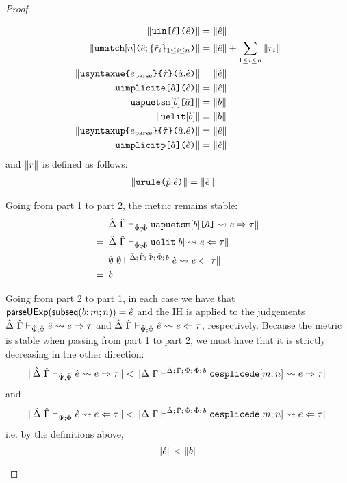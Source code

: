 \begin{proof}
\begin{itemize}
\begin{align*}
\Vert \texttt{uin}\texttt{[}\ell\texttt{](}{\hat e}\texttt{)} \Vert & = \Vert {\hat e} \Vert\\
\Vert \texttt{umatch}[n]\texttt{(}{\hat e}; \{\hat{r}_{i}\}_{1 \leq i \leq n}\texttt{)} \Vert & = \Vert {\hat e} \Vert + \sum_{1 \leq i \leq n} \Vert r_i \Vert\\
\Vert \texttt{usyntaxue}\texttt{\{}e_\text{parse}\texttt{\}\{}{\hat\tau}\texttt{\}(}\hat{a}.{\hat e}\texttt{)} \Vert & = \Vert {\hat e} \Vert\\
\Vert \texttt{uimplicite}\texttt{[}\hat{a}\texttt{](}{\hat e}\texttt{)} \Vert & = \Vert {\hat e} \Vert\\
\Vert \texttt{uapuetsm}[b]\texttt{[}\hat{a}\texttt{]} \Vert & = \Vert b \Vert\\
\Vert \texttt{uelit}[b] \Vert & = \Vert b \Vert\\
\Vert \texttt{usyntaxup}\texttt{\{}e_\text{parse}\texttt{\}\{}{\hat\tau}\texttt{\}(}\hat{a}.{\hat e}\texttt{)} \Vert & = \Vert {\hat e} \Vert\\
\Vert \texttt{uimplicitp}\texttt{[}\hat{a}\texttt{](}{\hat e}\texttt{)} \Vert & = \Vert {\hat e} \Vert
\end{align*}
and $\Vert r \Vert$ is defined as follows:
\begin{align*}
\Vert \texttt{urule}\texttt{(}\hat{p}.{\hat e}\texttt{)} \Vert & = \Vert {\hat e} \Vert
\end{align*}

Going from part 1 to part 2, the metric remains stable:
\begin{align*}
 & \Vert \hat{\Delta}~\hat{\Gamma} \vdash_{\hat{\Psi}; \hat\Phi} \texttt{uapuetsm}[b]\texttt{[}\hat{a}\texttt{]} \leadsto e \Rightarrow \tau \Vert\\
=& \Vert \hat{\Delta}~\hat{\Gamma} \vdash_{\hat{\Psi}; \hat\Phi} \texttt{uelit}[b] \leadsto e \Leftarrow \tau \Vert\\
=& \Vert \emptyset~\emptyset \vdash^{\hat{\Delta};\,\hat{\Gamma};\,\hat{\Psi};\,\hat\Phi;\,b} \grave{e} \leadsto e \Leftarrow \tau \Vert\\
=&\Vert b \Vert\end{align*}

Going from part 2 to part 1, in each case we have that $\mathsf{parseUExp}(\mathsf{subseq}(b; m; n))={\hat e}$ and the IH is applied to the judgements $\hat{\Delta}~\hat{\Gamma} \vdash_{\hat{\Psi}; \hat\Phi} {\hat e} \leadsto e \Rightarrow \tau$ and $\hat{\Delta}~\hat{\Gamma} \vdash_{\hat{\Psi}; \hat\Phi} {\hat e} \leadsto e \Leftarrow \tau$, respectively. Because the metric is stable when passing from part 1 to part 2, we must have that it is strictly decreasing in the other direction:
\[\Vert \hat{\Delta}~\hat{\Gamma} \vdash_{\hat{\Psi}; \hat\Phi} {\hat e} \leadsto e \Rightarrow \tau \Vert < \Vert \Delta~\Gamma \vdash^{\hat{\Delta};\,\hat{\Gamma};\,\hat{\Psi};\,\hat\Phi;\,b} \texttt{cesplicede}[m; n] \leadsto e \Rightarrow \tau \Vert\]
and
\[\Vert \hat{\Delta}~\hat{\Gamma} \vdash_{\hat{\Psi}; \hat\Phi} {\hat e} \leadsto e \Leftarrow \tau \Vert < \Vert \Delta~\Gamma \vdash^{\hat{\Delta};\,\hat{\Gamma};\,\hat{\Psi};\,\hat\Phi;\,b} \texttt{cesplicede}[m; n] \leadsto e \Leftarrow \tau \Vert\]
i.e. by the definitions above, 
\[\Vert {\hat e} \Vert < \Vert b \Vert\]


\end{itemize}
\end{proof}
